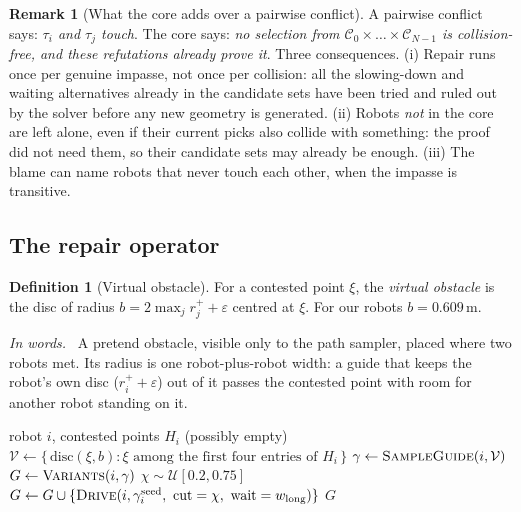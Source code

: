 \documentclass[conference]{IEEEtran}
\theoremstyle{plain}
\theoremstyle{definition}
\newtheorem{definition}{Definition}
\newtheorem{remark}{Remark}
\newcommand{\inwords}{\par\smallskip\noindent\textit{In words.}\ }
\newcommand{\Cand}{\mathcal{C}}
\newcommand{\clr}{\varepsilon}
\begin{document}
\begin{remark}[What the core adds over a pairwise conflict]
\label{rem:corevspair}
A pairwise conflict says: \emph{$\tau_i$ and $\tau_j$ touch}. The core says: \emph{no
selection from $\Cand_0 \times \dots \times \Cand_{N-1}$ is collision-free, and these
refutations already prove it}. Three consequences.
(i) Repair runs once per genuine impasse, not once per collision: all the slowing-down and
waiting alternatives already in the candidate sets have been tried and ruled out by the
solver before any new geometry is generated.
(ii) Robots \emph{not} in the core are left alone, even if their current picks also collide
with something: the proof did not need them, so their candidate sets may already be enough.
(iii) The blame can name robots that never touch each other, when the impasse is transitive.
\end{remark}

\subsection{The repair operator}
\label{sec:repair}

\begin{definition}[Virtual obstacle]
\label{def:virtual}
For a contested point $\xi$, the \emph{virtual obstacle} is the disc of radius
$b = 2\max_j r^{+}_j + \clr$ centred at $\xi$. For our robots $b = 0.609$\,m.
\inwords
A pretend obstacle, visible only to the path sampler, placed where two robots met. Its radius
is one robot-plus-robot width: a guide that keeps the robot's own disc ($r^{+}_i + \clr$)
out of it passes the contested point with room for another robot standing on it.
\end{definition}

\begin{algorithm}[t]
\caption{\textsc{Repair}: new candidates for a blamed robot}
\label{alg:repair}
\begin{algorithmic}[1]
\Require robot $i$, contested points $H_i$ (possibly empty)
\State $\mathcal{V} \gets \{\,\text{disc}(\xi, b) : \xi \text{ among the first four entries of } H_i\,\}$
\State $\gamma \gets \textsc{SampleGuide}(i, \mathcal{V})$ 
\State $G \gets \textsc{Variants}(i, \gamma)$ 
\State $\chi \sim \mathcal{U}[0.2, 0.75]$
\State $G \gets G \cup \{\textsc{Drive}(i, \gamma_i^{\text{seed}},\ \text{cut}=\chi,\ \text{wait}=w_{\text{long}})\}$
\State \Return $G$ \Comment{appended to $\Cand_i$; nothing removed}
\end{algorithmic}
\end{algorithm}
\end{document}
